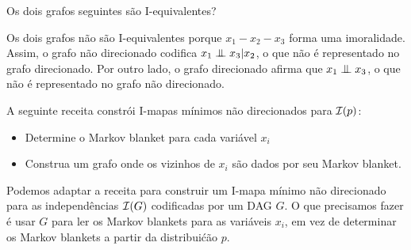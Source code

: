 \begin{exenumerate}
    \item Os dois grafos seguintes s\~ao I-equivalentes?
    \begin{center}
        \hspace{6ex}
    \end{center}
    
    \begin{solution}
        Os dois grafos n\~ao s\~ao I-equivalentes porque $x_1-x_2-x_3$ forma uma imoralidade. Assim, o grafo n\~ao direcionado codifica $x_1 \mathrel{\perp\mspace{-10mu}\perp} x_3 | x_2$, o que n\~ao \'e representado no grafo direcionado. Por outro lado, o grafo direcionado afirma que $x_1 \mathrel{\perp\mspace{-10mu}\perp} x_3$, o que n\~ao \'e representado no grafo n\~ao direcionado.
    \end{solution}
    
\end{exenumerate}

\label{ex:DAG-to-undirected}
A seguinte receita constr\'oi I-mapas m\'inimos n\~ao direcionados para $\mathcal{I}(p)$:
\begin{itemize}
    \item Determine o Markov blanket para cada vari\'avel $x_i$
    \item Construa um grafo onde os vizinhos de $x_i$ s\~ao dados por seu Markov blanket.
\end{itemize}
Podemos adaptar a receita para construir um I-mapa m\'inimo n\~ao direcionado para as independ\^encias $\mathcal{I}(G)$ codificadas por um DAG $G$. O que precisamos fazer \'e usar $G$ para ler os Markov blankets para as vari\'aveis $x_i$, em vez de determinar os Markov blankets a partir da distribui\'c\~ao $p$.

